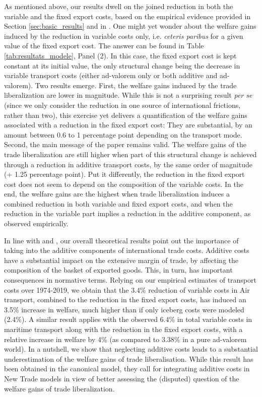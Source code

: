 \documentclass[a4paper,11pt]{article}
\begin{document}
As mentioned above, our results dwell on the joined reduction in both the variable and the fixed export costs, based on the empirical evidence provided in Section  \ref{sec:basic_results} and in \cite{Lincoln_McCallum2018}. One might yet wonder about the welfare gains induced by the reduction in variable costs only, i.e. \textit{ceteris paribus} for a given value of the fixed export cost. The answer can be found in Table \ref{tab:resultats_modele}, Panel (2). In this case, the fixed export cost is kept constant at its initial value, the only structural change being the decrease in variable transport costs (either ad-valorem only or both additive and ad-valorem). Two results emerge. First, the welfare gains induced by the trade liberalization are lower in magnitude. While this is not a surprising result \textit{per se} (since we only consider the reduction in one source of international frictions, rather than two), this exercise yet delivers a quantification of the welfare gains associated with a reduction in the fixed export cost: They are substantial, by an amount between 0.6 to 1 percentage point depending on the transport mode. Second, the main message of the paper remains valid. The welfare gains of the trade liberalization are still higher when part of this structural change is achieved through a reduction in additive transport costs, by the same order of magnitude (+ 1.25 percentage point). Put it differently, the reduction in the fixed export cost does not seem to depend on the composition of the variable costs. In the end, the welfare gains are the highest when trade liberalization induces a combined reduction in both variable and fixed export costs, and when the reduction in the variable part implies a reduction in the additive component, as observed empirically.\smallskip

In line with \cite{sorensen2014} and \cite{Irrazabal_2015}, our overall theoretical results point out the importance of taking into the additive components of international trade costs. Additive costs have a substantial impact on the extensive margin of trade, by affecting the composition of the basket of exported goods. This, in turn, has important consequences in normative terms. Relying on our empirical estimates of transport costs over 1974-2019, we obtain that the 3.4\% reduction of variable costs in Air transport, combined to the reduction in the fixed export costs, has induced an 3.5\% increase in welfare, much higher than if only iceberg costs were modeled (2.4\%). A similar result applies with the observed 6.4\% in total variable costs in maritime transport along with the reduction in the fixed export costs, with a relative increase in welfare by 4\% (as compared to 3.38\% in a pure ad-valorem world). In a nutshell, we show that neglecting additive costs leads to a substantial underestimation of the welfare gains of trade liberalisation. While this result has been obtained in the canonical \cite{melitz} model, they call for integrating additive costs in New Trade models in view of better assessing the (disputed) question of the welfare gains of trade liberalization.
\end{document}
